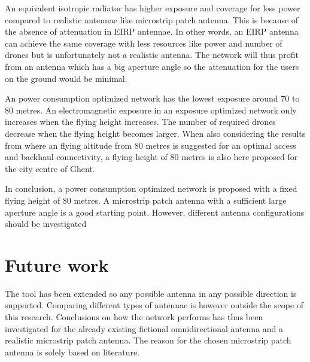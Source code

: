An equivalent isotropic radiator has higher exposure and coverage for less power compared to realistic antennae like microstrip patch antenna.
This is because  of the absence of attenuation in \gls{EIRP} antennae. In other words, an \gls{EIRP} antenna can achieve the same coverage with less
resources like power and number of drones but is unfortunately not a realistic antenna. The network will thus profit from an antenna which has a big 
aperture angle so the attenuation for the users on the ground would be minimal.


An power consumption optimized network has the lowest exposure around 70 to 80 metres. An electromagnetic exposure in an 
exposure optimized network only increases when the flying height increases. The number of required drones decrease 
when the flying height becomes larger. When also considering the results from \cite{J27_backhaul} where an flying altitude from 
80 metres is suggested for an optimal access and backhaul connectivity, a flying height 
of 80 metres is also here proposed for the city centre of Ghent.

In conclusion, a power consumption optimized network is proposed with a fixed flying height of 80 metres. A microstrip patch 
antenna with a sufficient large aperture angle is a good starting point. However, different antenna configurations should 
be investigated 

\section{Future work}
The tool has been extended so any possible antenna in any possible direction is supported. Comparing different types 
of antennae is however outside the scope of this research.
Conclusions on how the network performs has thus been investigated for the already existing fictional omnidirectional antenna and a 
realistic microstrip patch antenna. The reason for the chosen microstrip patch antenna is solely based on literature.

